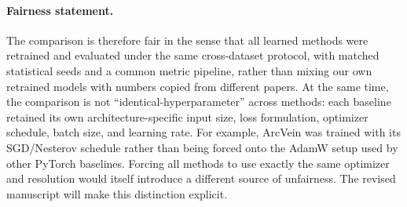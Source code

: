 \documentclass[11pt]{article}
\begin{document}
\begin{table}[ht!]
    \centering
    \scriptsize
    \caption{Training configurations of the proposed model and the learned baselines used in the leave-one-dataset-out experiments.}
    \label{tab:rebuttal_baseline_training}
\end{table}

\paragraph{Fairness statement.}
The comparison is therefore fair in the sense that all learned methods were retrained and evaluated under the same cross-dataset protocol, with matched statistical seeds and a common metric pipeline, rather than mixing our own retrained models with numbers copied from different papers. At the same time, the comparison is not ``identical-hyperparameter'' across methods: each baseline retained its own architecture-specific input size, loss formulation, optimizer schedule, batch size, and learning rate. For example, ArcVein was trained with its SGD/Nesterov schedule rather than being forced onto the AdamW setup used by other PyTorch baselines. Forcing all methods to use exactly the same optimizer and resolution would itself introduce a different source of unfairness. The revised manuscript will make this distinction explicit.
\end{document}
